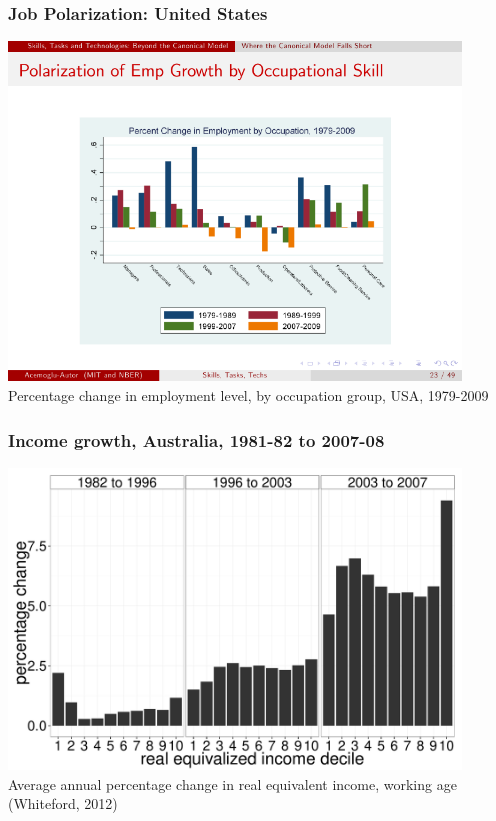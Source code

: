\documentclass[red]{beamer}
\begin{document}
\begin{frame}
  \frametitle{Job Polarization: United States}
  \begin{center}
  \includegraphics[width=0.9\textwidth]{slides/level_by_occ.pdf} \\
  Percentage change in employment level, by occupation group, USA, 1979-2009 \citep{Acemoglu2011}
  \end{center}
\end{frame}

\begin{frame}
  \frametitle{Income growth, Australia, 1981-82 to 2007-08}
  \begin{center}
  \includegraphics[width=0.9\textwidth]{slides/figure_wage_deciles.pdf} \\
  Average annual percentage change in real equivalent income, working age (Whiteford, 2012)
  \end{center}
\end{frame}
\end{document}
